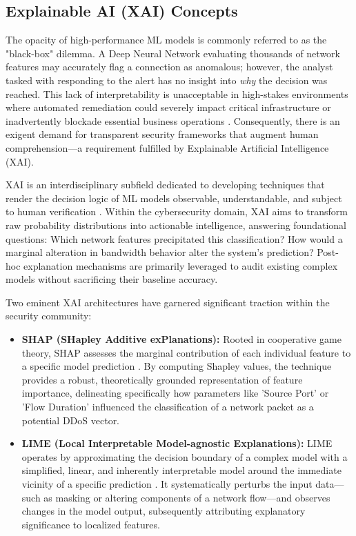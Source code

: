 \documentclass[conference]{IEEEtran}
\begin{document}
\subsection{Explainable AI (XAI) Concepts}
The opacity of high-performance ML models is commonly referred to as the "black-box" dilemma. A Deep Neural Network evaluating thousands of network features may accurately flag a connection as anomalous; however, the analyst tasked with responding to the alert has no insight into \textit{why} the decision was reached. This lack of interpretability is unacceptable in high-stakes environments where automated remediation could severely impact critical infrastructure or inadvertently blockade essential business operations \cite{ribeiro2016should}. Consequently, there is an exigent demand for transparent security frameworks that augment human comprehension—a requirement fulfilled by Explainable Artificial Intelligence (XAI).

XAI is an interdisciplinary subfield dedicated to developing techniques that render the decision logic of ML models observable, understandable, and subject to human verification \cite{stafford2020zero, moustafa2015unsw}. Within the cybersecurity domain, XAI aims to transform raw probability distributions into actionable intelligence, answering foundational questions: Which network features precipitated this classification? How would a marginal alteration in bandwidth behavior alter the system’s prediction? Post-hoc explanation mechanisms are primarily leveraged to audit existing complex models without sacrificing their baseline accuracy.

Two eminent XAI architectures have garnered significant traction within the security community:
\begin{itemize}
\item \textbf{SHAP (SHapley Additive exPlanations):} Rooted in cooperative game theory, SHAP assesses the marginal contribution of each individual feature to a specific model prediction \cite{mahbooba2021explainable}. By computing Shapley values, the technique provides a robust, theoretically grounded representation of feature importance, delineating specifically how parameters like 'Source Port' or 'Flow Duration' influenced the classification of a network packet as a potential DDoS vector. 
\item \textbf{LIME (Local Interpretable Model-agnostic Explanations):} LIME operates by approximating the decision boundary of a complex model with a simplified, linear, and inherently interpretable model around the immediate vicinity of a specific prediction \cite{alotaibi2023adaptive}. It systematically perturbs the input data—such as masking or altering components of a network flow—and observes changes in the model output, subsequently attributing explanatory significance to localized features.
\end{itemize}
\end{document}
